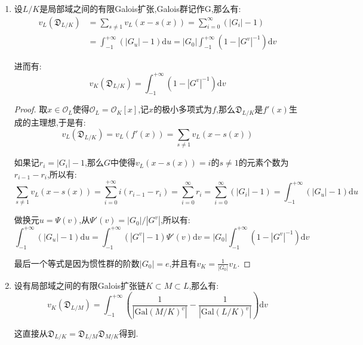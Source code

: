 \begin{enumerate}
\begin{proof}
		设$f(X)=a_0+a_1X+\cdots+a_nX^n$,在$\mathscr{O}_L$中做分解$f(X)=(X-x)g(X)$,记$g(X)=b_0+\cdots+b_{n-1}X^{n-1}$.这里$\{1,x,\cdots,x^{n-1}\}$是$\mathscr{O}_L$在$\mathscr{O}_K$上的一组基.我们断言它关于迹二次型$\mathrm{Tr}(xy)$的对偶基是$\{\frac{b_0}{f'(x)},\cdots,\frac{b_{n-1}}{f'(x)}\}$:事实上按照插值公式有$\sum_{1\le i\le n}\frac{f(X)}{X-x_i}\frac{x_i^r}{f'(x_i)}=X^r$,其中$\{x_1,\cdots,x_n\}$是$f(X)$在某个分裂域中的全部$n$个根,这个等式可以写作$\mathrm{Tr}(\frac{f(X)}{X-x}\frac{x^r}{f'(x)})=X^r$.比较系数得到$\mathrm{Tr}(x^i\frac{b_j}{f'(x)})=\delta_{ij}$.
		
		\qquad
		
		于是按照对偶基有$\mathfrak{C}_{L/K}=\frac{1}{f'(x)}(Ab_0+Ab_1+\cdots Ab_{n-1})$.考虑$b_i$和$a_j$的关系式$b_{n-1}=1,b_{n-2}-xb_{n-1}=a_{n-1}$,递推得到$Ab_0+\cdots+Ab_{n-1}=A[x]=B$.所以有$\mathfrak{C}_{L/K}$是$1/f'(x)$生成的$\mathscr{O}_L$的主分式理想,导致$\mathfrak{D}_{L/K}=(f'(x))$.
	\end{proof}
	\item 设$L/K$是局部域之间的有限Galois扩张,Galois群记作G,那么有:
	\begin{align*}
		v_L(\mathfrak{D}_{L/K})&=\sum_{s\not=1}v_L(x-s(x))=\sum_{i=0}^{\infty}(|G_i|-1)\\&=\int_{-1}^{+\infty}(|G_u|-1)\mathrm{d}u=|G_0|\int_{-1}^{+\infty}(1-|G^v|^{-1})\mathrm{d}v
	\end{align*}
	
	进而有:$$v_K(\mathfrak{D}_{L/K})=\int_{-1}^{+\infty}(1-|G^v|^{-1})\mathrm{d}v$$
	\begin{proof}
		
		取$x\in\mathscr{O}_L$使得$\mathscr{O}_L=\mathscr{O}_K[x]$,记$x$的极小多项式为$f$,那么$\mathfrak{D}_{L/K}$是$f'(x)$生成的主理想,于是有:
		$$v_L(\mathfrak{D}_{L/K})=v_L(f'(x))=\sum_{s\not=1}v_L(x-s(x))$$
		
		如果记$r_i=|G_i|-1$,那么$G$中使得$v_L(x-s(x))=i$的$s\not=1$的元素个数为$r_{i-1}-r_i$,所以有:
		$$\sum_{s\not=1}v_L(x-s(x))=\sum_{i=0}^{+\infty}i(r_{i-1}-r_i)=\sum_{i=0}^{\infty}r_i=\sum_{i=0}^{\infty}(|G_i|-1)=\int_{-1}^{+\infty}(|G_u|-1)\mathrm{d}u$$
		
		做换元$u=\Psi(v)$,从$\Psi'(v)=|G_0|/|G^v|$,所以有:
		$$\int_{-1}^{+\infty}(|G_u|-1)\mathrm{d}u=\int_{-1}^{+\infty}(|G^v|-1)\Psi'(v)\mathrm{d}v=|G_0|\int_{-1}^{+\infty}(1-|G^v|^{-1})\mathrm{d}v$$
		
		最后一个等式是因为惯性群的阶数$|G_0|=e$,并且有$v_K=\frac{1}{|G_0|}v_L$.
	\end{proof}
	\item 设有局部域之间的有限Galois扩张链$K\subset M\subset L$,那么有:
	$$v_K(\mathfrak{D}_{L/M})=\int_{-1}^{+\infty}\left(\frac{1}{|\mathrm{Gal}(M/K)^v|}-\frac{1}{|\mathrm{Gal}(L/K)^v|}\right)\mathrm{d}v$$
	
	这直接从$\mathfrak{D}_{L/K}=\mathfrak{D}_{L/M}\mathfrak{D}_{M/K}$得到.
\end{enumerate}

